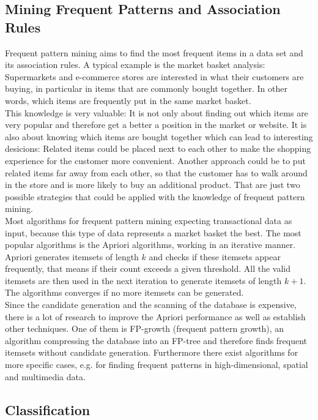 \subsection{Mining Frequent Patterns and Association Rules}
Frequent pattern mining aims to find the most frequent items in a data set and its association rules. A typical example is the market basket analysis: Supermarkets and e-commerce stores are interested in what their customers are buying, in particular in items that are commonly bought together. In other words, which items are frequently put in the same market basket. 
\\
This knowledge is very valuable: It is not only about finding out which items are very popular and therefore get a better a position in the market or website. It is also about knowing which items are bought together which can lead to interesting desicions: Related items could be placed next to each other to make the shopping experience for the customer more convenient. Another approach could be to put related items far away from each other, so that the customer has to walk around in the store and is more likely to buy an additional product. That are just two possible strategies that could be applied with the knowledge of frequent pattern mining.
\\
Most algorithms for frequent pattern mining expecting transactional data as input, because this type of data represents a market basket the best. The most popular algorithms is the Apriori algorithms, working in an iterative manner. Apriori generates itemsets of length $k$ and checks if these itemsets appear frequently, that means if their count exceeds a given threshold. All the valid itemsets are then used in the next iteration to generate itemsets of length $k+1$. The algorithms converges if no more itemsets can be generated.
\\
Since the candidate generation and the scanning of the database is expensive, there is a lot of research to improve the Apriori performance as well as establish other techniques. One of them is FP-growth (frequent pattern growth), an algorithm compressing the database into an FP-tree and therefore finds frequent itemsets without candidate generation. Furthermore there exist algorithms for more specific cases, e.g. for finding frequent patterns in high-dimensional, spatial and multimedia data.

\subsection{Classification}

